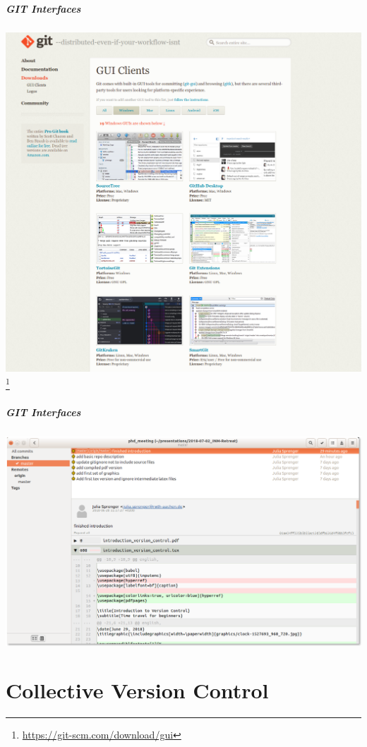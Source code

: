 \documentclass[
t, %
10pt, %
aspectratio=1610, %
ngerman,
english,
]{beamer}
\newcommand\blfootnote[1]{%
  \begingroup
  \renewcommand\thefootnote{}\footnote{#1}%
  \addtocounter{footnote}{-1}%
  \endgroup
}
\begin{document}
\begin{frame}
    \frametitle{GIT Interfaces}
    \centering
    \includegraphics[height=0.8\textheight]{graphics/Screenshot_GUI_Clients.png}\\
    \blfootnote{\url{https://git-scm.com/download/gui}}
\end{frame}

\begin{frame}
    \frametitle{GIT Interfaces}
    \centering
    \includegraphics[height=0.8\textheight]{graphics/Screenshot_gitg.png}\\
\end{frame}

\part{Collective Version Control}
\makepart
\end{document}
